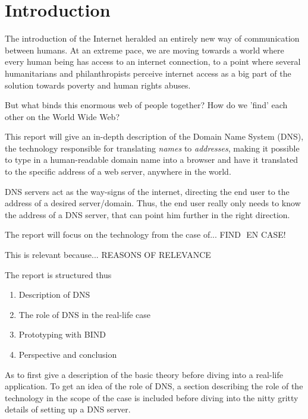 \chapter{Introduction}
The introduction of the Internet heralded an entirely new way of communication between humans. At an extreme pace, we are moving towards a world where every human being has access to an internet connection, to a point where several humanitarians and philanthropists perceive internet access as a big part of the solution towards poverty and human rights abuses.

But what binds this enormous web of people together? How do we 'find' each other on the World Wide Web?

This report will give an in-depth description of the Domain Name System (DNS), the technology responsible for translating \textit{names} to \textit{addresses}, making it possible to type in a human-readable domain name into a browser and have it translated to the specific address of a web server, anywhere in the world.

DNS servers act as the way-signs of the internet, directing the end user to the address of a desired server/domain. Thus, the end user really only needs to know the address of a DNS server, that can point him further in the right direction.

The report will focus on the technology from the case of... FIND  EN CASE!

This is relevant because... REASONS OF RELEVANCE

The report is structured thus
\begin{enumerate}
\item Description of DNS
\item The role of DNS in the real-life case
\item Prototyping with BIND
\item Perspective and conclusion
\end{enumerate}

As to first give a description of the basic theory before diving into a real-life application. To get an idea of the role of DNS, a section describing the role of the technology in the scope of the case is included before diving into the nitty gritty details of setting up a DNS server.
